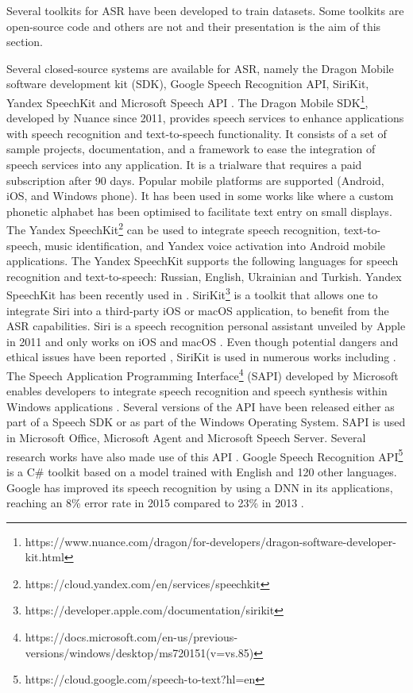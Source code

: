Several toolkits for ASR have been developed to train datasets. Some toolkits are open-source code and others are not and their presentation is the aim of this section.

Several closed-source systems are available for ASR, namely the Dragon Mobile software development kit (SDK), Google Speech Recognition API, SiriKit, Yandex SpeechKit and Microsoft Speech API .
The Dragon Mobile SDK\footnote{https://www.nuance.com/dragon/for-developers/dragon-software-developer-kit.html },  developed by Nuance since 2011, provides speech services to enhance applications with speech recognition and text-to-speech functionality. It consists of a set of sample projects, documentation, and a framework to ease the integration of speech services into any application. It is a trialware that requires a paid subscription after 90 days. Popular mobile platforms are supported (Android, iOS, and Windows phone). It has been used in some works like  where a custom phonetic alphabet has been optimised to facilitate text entry on small displays.
The Yandex SpeechKit\footnote{https://cloud.yandex.com/en/services/speechkit }  can be used to integrate speech recognition, text-to-speech, music identification, and Yandex voice activation into Android mobile applications. The Yandex SpeechKit supports the following languages for speech recognition and text-to-speech: Russian, English, Ukrainian and Turkish. Yandex SpeechKit has been recently used in . 
SiriKit\footnote{https://developer.apple.com/documentation/sirikit}  is a toolkit that allows one to integrate Siri into a third-party iOS or macOS application, to benefit from the ASR capabilities. Siri is a speech recognition personal assistant unveiled by Apple in 2011 and only works on iOS and macOS . Even though potential dangers and ethical issues have been reported , SiriKit is used in numerous works including .
The Speech Application Programming Interface\footnote{https://docs.microsoft.com/en-us/previous-versions/windows/desktop/ms720151(v=vs.85)} (SAPI) developed by Microsoft enables developers to integrate speech recognition and speech synthesis within Windows applications . Several versions of the API have been released either as part of a Speech SDK or as part of the Windows Operating System. SAPI is used in Microsoft Office, Microsoft Agent and Microsoft Speech Server. Several research works have also made use of this API .
Google Speech Recognition API\footnote{https://cloud.google.com/speech-to-text?hl=en }  is a C\# toolkit based on a model trained with English and 120 other languages. Google has improved its speech recognition by using a DNN in its applications, reaching an 8\% error rate in 2015 compared to 23\% in 2013 . 
